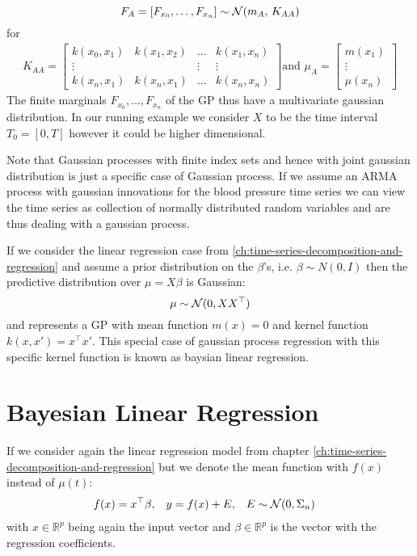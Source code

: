 \[F_A = [F_{x_0}, \dots , F_{x_n}] \sim \operatorname{\mathcal{N}}(m_A,\,K_{AA})\]
for
\begin{gather}
    K_{AA} =
    \begin{bmatrix}
        k(x_0, x_1) & k(x_1, x_2) & \dots & k(x_1, x_n)\\
        \vdots  &  & \vdots  & \vdots \\
        k(x_n, x_1)  & k(x_n, x_1) & \dots  & k(x_n, x_n)
    \end{bmatrix} \text{and }
    \mu_A =
    \begin{bmatrix}
        m(x_1) \\
        \vdots \\
        \mu(x_n)
    \end{bmatrix}
\end{gather}
The finite marginals $F_{x_0}, \dots, F_{x_n}$ of the GP thus have a multivariate gaussian distribution.
In our running example we consider $X$ to be the time interval $T_0=[0, T]$ however it could be higher dimensional.

Note that Gaussian processes with finite index sets and hence with joint gaussian distribution is just a specific case
of Gaussian process. If we assume an ARMA process with gaussian innovations for the blood pressure time series
we can view the time series
as collection of normally distributed random variables and are thus dealing with a gaussian process.


If we consider the linear regression case from \ref{ch:time-series-decomposition-and-regression} and assume a
prior distribution
on the $\beta$'s, i.e. $\beta \sim N(0, I)$ then the predictive distribution over $\mu = X \beta$ is Gaussian:
\[
    \mu \sim \operatorname{\mathcal{N}}(0, XX^{\top})
\]
and represents a GP with mean function $m(x) = 0$ and kernel function $k(x, x') = x^{\top}x'$.
This special case of gaussian process regression with this specific kernel function is known as baysian linear regression.


\section{Bayesian Linear Regression}

If we consider again the linear regression model from chapter \ref{ch:time-series-decomposition-and-regression} but
we denote the mean function with $f(x)$ instead of $\mu(t)$:
\begin{align*}
    f(x) &= x^{\top}\beta, & y &= f(x) + E, & E &\sim \operatorname{\mathcal{N}}(0, \Sigma_n)
\end{align*}
with $x \in \mathbb{R}^p$ being again the input vector and $\beta \in \mathbb{R}^p$ is the vector with
the regression coefficients.

